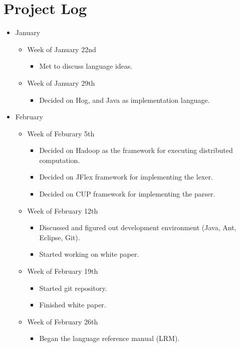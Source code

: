 \documentclass{report}
\begin{document}
\section{Project Log}

\begin{itemize}
\item[] January
\begin{itemize}
\item[] Week of January 22nd
\begin{itemize}
\item Met to discuss language ideas.
\end{itemize}
\item[] Week of January 29th
\begin{itemize}
\item Decided on Hog, and Java as implementation language.
\end{itemize}
\end{itemize}
\item[] February
\begin{itemize}
\item[] Week of Feburary 5th
\begin{itemize}
\item Decided on Hadoop as the framework for executing distributed computation.
\item Decided on JFlex framework for implementing the lexer.
\item Decided on CUP framework for implementing the parser. 
\end{itemize}
\item[] Week of February 12th
\begin{itemize}
\item Discussed and figured out development environment (Java, Ant, Eclipse, Git).
\item Started working on white paper.
\end{itemize}
\item[] Week of February 19th
\begin{itemize}
\item Started git repository.
\item Finished white paper.
\end{itemize}
\item[] Week of February 26th 
\begin{itemize}
\item Began the language reference manual (LRM). 
\end{itemize}
\end{itemize}

\end{itemize}
\end{document}
